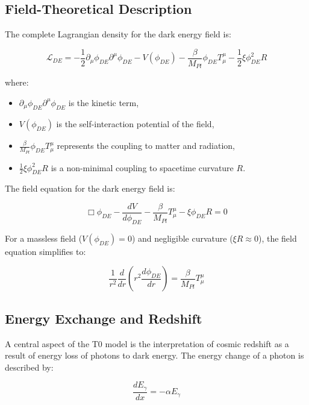 \documentclass[a4paper,12pt]{article}
\theoremstyle{definition}
\theoremstyle{remark}
\begin{document}
	\subsection{Field-Theoretical Description}
	
	The complete Lagrangian density for the dark energy field is:
	
	\begin{equation}
		\mathcal{L}_{DE} = -\frac{1}{2}\partial_\mu \phi_{DE} \partial^\mu \phi_{DE} - V(\phi_{DE}) - \frac{\beta}{M_{Pl}} \phi_{DE} T^{\mu}_{\mu} - \frac{1}{2}\xi \phi_{DE}^2 R
	\end{equation}
	
	where:
	\begin{itemize}
		\item $\partial_\mu \phi_{DE} \partial^\mu \phi_{DE}$ is the kinetic term,
		\item $V(\phi_{DE})$ is the self-interaction potential of the field,
		\item $\frac{\beta}{M_{Pl}} \phi_{DE} T^{\mu}_{\mu}$ represents the coupling to matter and radiation,
		\item $\frac{1}{2}\xi \phi_{DE}^2 R$ is a non-minimal coupling to spacetime curvature $R$.
	\end{itemize}
	
	The field equation for the dark energy field is:
	
	\begin{equation}
		\Box\phi_{DE} - \frac{dV}{d\phi_{DE}} - \frac{\beta}{M_{Pl}}T^{\mu}_{\mu} - \xi \phi_{DE} R = 0
	\end{equation}
	
	For a massless field ($V(\phi_{DE}) = 0$) and negligible curvature ($\xi R \approx 0$), the field equation simplifies to:
	
	\begin{equation}
		\frac{1}{r^2}\frac{d}{dr}\left(r^2\frac{d\phi_{DE}}{dr}\right) = \frac{\beta}{M_{Pl}}T^{\mu}_{\mu}
	\end{equation}
	
	\subsection{Energy Exchange and Redshift}
	
	A central aspect of the T0 model is the interpretation of cosmic redshift as a result of energy loss of photons to dark energy. The energy change of a photon is described by:
	
	\begin{equation}
		\frac{dE_{\gamma}}{dx} = -\alpha E_{\gamma}
	\end{equation}
	
\end{document}
